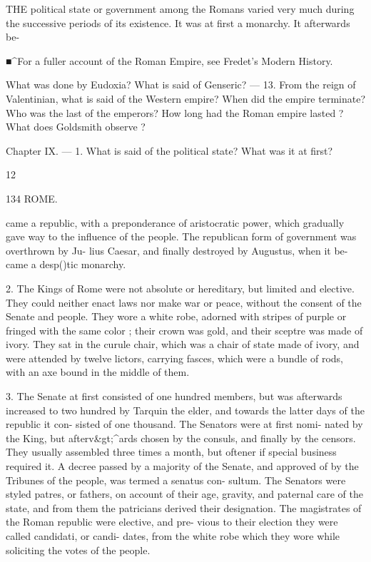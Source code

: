 \documentclass[openany,a4paper]{memoir}
\begin{document}
THE political state or government among the Romans 
varied very much during the successive periods of its 
existence. It was at first a monarchy. It afterwards be- 

■^For a fuller account of the Roman Empire, see Fredet's Modern 
History. 

What was done by Eudoxia? What is said of Genseric? — 13. From 
the reign of Valentinian, what is said of the Western empire? When 
did the empire terminate? Who was the last of the emperors? How 
long had the Roman empire lasted ? What does Goldsmith observe ? 

Chapter IX. — 1. What is said of the political state? What was it 
at first? 

12 



134 ROME. 

came a republic, with a preponderance of aristocratic power, 
which gradually gave way to the influence of the people. 
The republican form of government was overthrown by Ju- 
lius Caesar, and finally destroyed by Augustus, when it be- 
came a desp()tic monarchy. 

2. The Kings of Rome were not absolute or hereditary, 
but limited and elective. They could neither enact laws nor 
make war or peace, without the consent of the Senate and 
people. They wore a white robe, adorned with stripes of 
purple or fringed with the same color ; their crown was gold, 
and their sceptre was made of ivory. They sat in the curule 
chair, which was a chair of state made of ivory, and were 
attended by twelve lictors, carrying fasces, which were a 
bundle of rods, with an axe bound in the middle of them. 

3. The Senate at first consisted of one hundred members, 
but was afterwards increased to two hundred by Tarquin 
the elder, and towards the latter days of the republic it con- 
sisted of one thousand. The Senators were at first nomi- 
nated by the King, but afterv&gt;^ards chosen by the consuls, 
and finally by the censors. They usually assembled three 
times a month, but oftener if special business required it. A 
decree passed by a majority of the Senate, and approved 
of by the Tribunes of the people, was termed a senatus con- 
sultum. The Senators were styled patres, or fathers, on 
account of their age, gravity, and paternal care of the state, 
and from them the patricians derived their designation. The 
magistrates of the Roman republic were elective, and pre- 
vious to their election they were called candidati, or candi- 
dates, from the white robe which they wore while soliciting 
the votes of the people. 
\end{document}

